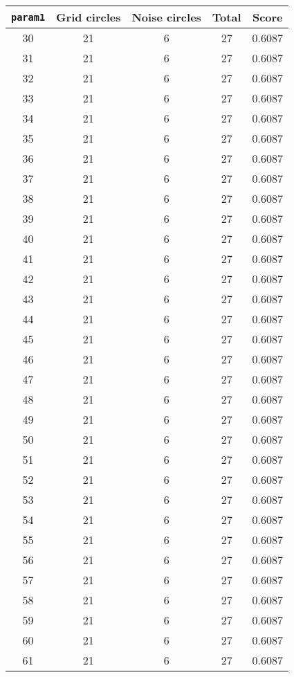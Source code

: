 \documentclass[letterpaper, 12pt]{article}
\begin{document}
\begin{longtable}{|c|c|c|c|c|}
\hline
\textbf{\texttt{param1}} & \textbf{Grid circles} & \textbf{Noise circles} & \textbf{Total} & \textbf{Score} \\
\hline
30 & 21 & 6 & 27 & 0.6087 \\
\hline
31 & 21 & 6 & 27 & 0.6087 \\
\hline
32 & 21 & 6 & 27 & 0.6087 \\
\hline
33 & 21 & 6 & 27 & 0.6087 \\
\hline
34 & 21 & 6 & 27 & 0.6087 \\
\hline
35 & 21 & 6 & 27 & 0.6087 \\
\hline
36 & 21 & 6 & 27 & 0.6087 \\
\hline
37 & 21 & 6 & 27 & 0.6087 \\
\hline
38 & 21 & 6 & 27 & 0.6087 \\
\hline
39 & 21 & 6 & 27 & 0.6087 \\
\hline
40 & 21 & 6 & 27 & 0.6087 \\
\hline
41 & 21 & 6 & 27 & 0.6087 \\
\hline
42 & 21 & 6 & 27 & 0.6087 \\
\hline
43 & 21 & 6 & 27 & 0.6087 \\
\hline
44 & 21 & 6 & 27 & 0.6087 \\
\hline
45 & 21 & 6 & 27 & 0.6087 \\
\hline
46 & 21 & 6 & 27 & 0.6087 \\
\hline
47 & 21 & 6 & 27 & 0.6087 \\
\hline
48 & 21 & 6 & 27 & 0.6087 \\
\hline
49 & 21 & 6 & 27 & 0.6087 \\
\hline
50 & 21 & 6 & 27 & 0.6087 \\
\hline
51 & 21 & 6 & 27 & 0.6087 \\
\hline
52 & 21 & 6 & 27 & 0.6087 \\
\hline
53 & 21 & 6 & 27 & 0.6087 \\
\hline
54 & 21 & 6 & 27 & 0.6087 \\
\hline
55 & 21 & 6 & 27 & 0.6087 \\
\hline
56 & 21 & 6 & 27 & 0.6087 \\
\hline
57 & 21 & 6 & 27 & 0.6087 \\
\hline
58 & 21 & 6 & 27 & 0.6087 \\
\hline
59 & 21 & 6 & 27 & 0.6087 \\
\hline
60 & 21 & 6 & 27 & 0.6087 \\
\hline
61 & 21 & 6 & 27 & 0.6087 \\

\end{longtable}
\end{document}

